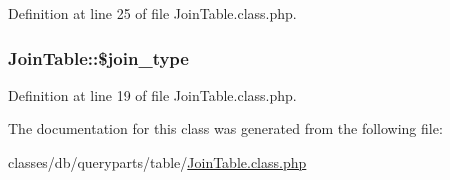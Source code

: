 Definition at line 25 of file Join\-Table.\-class.\-php.

\hypertarget{classJoinTable_a00c6a8c44beb3b85c9f3a3e5be03fba8}{
\subsubsection[{\$join\-\_\-type}]{\setlength{\rightskip}{0pt plus 5cm}Join\-Table\-::\$join\-\_\-type}}\label{classJoinTable_a00c6a8c44beb3b85c9f3a3e5be03fba8}


Definition at line 19 of file Join\-Table.\-class.\-php.



The documentation for this class was generated from the following file\-:\begin{DoxyCompactItemize}
\item 
classes/db/queryparts/table/\hyperlink{JoinTable_8class_8php}{Join\-Table.\-class.\-php}\end{DoxyCompactItemize}
